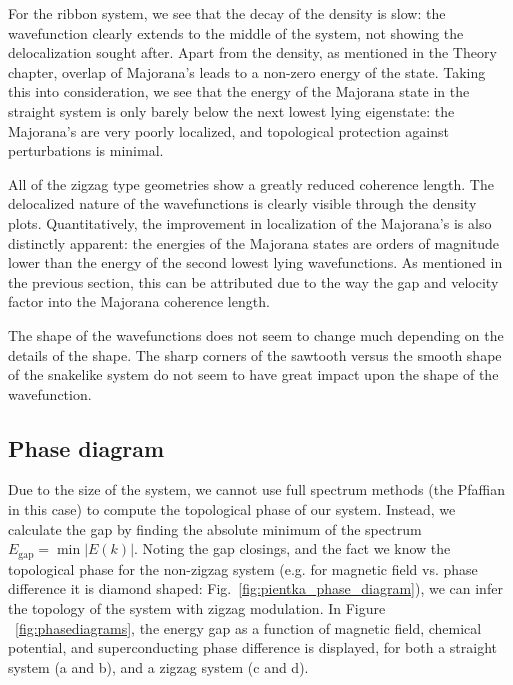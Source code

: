 			For the ribbon system, we see that the decay of the density is slow: the wavefunction clearly extends to the middle of the system, not showing the delocalization sought after.
			Apart from the density, as mentioned in the Theory chapter, overlap of Majorana's leads to a non-zero energy of the state.
			Taking this into consideration, we see that the energy of the Majorana state in the straight system is only barely below the next lowest lying eigenstate: the Majorana's are very poorly localized, and topological protection against perturbations is minimal.
			
			All of the zigzag type geometries show a greatly reduced coherence length.
			The delocalized nature of the wavefunctions is clearly visible through the density plots.
			Quantitatively, the improvement in localization of the Majorana's is also distinctly apparent: the energies of the Majorana states are orders of magnitude lower than the energy of the second lowest lying wavefunctions.
			As mentioned in the previous section, this can be attributed due to the way the gap and velocity factor into the Majorana coherence length.

			The shape of the wavefunctions does not seem to change much depending on the details of the shape.
			The sharp corners of the sawtooth versus the smooth shape of the snakelike system do not seem to have great impact upon the shape of the wavefunction.


		\subsection{Phase diagram}

			Due to the size of the system, we cannot use full spectrum methods (the Pfaffian in this case) to compute the topological phase of our system.
			Instead, we calculate the gap by finding the absolute minimum of the spectrum $E_\textrm{gap}=\min{|E(k)|}$.
			Noting the gap closings, and the fact we know the topological phase for the non-zigzag system (e.g. for magnetic field vs. phase difference it is diamond shaped: Fig.~\ref{fig:pientka_phase_diagram}), we can infer the topology of the system with zigzag modulation.
			In Figure ~\ref{fig:phasediagrams}, the energy gap as a function of magnetic field, chemical potential, and superconducting phase difference is displayed, for both a straight system (a and b), and a zigzag system (c and d).

